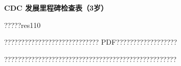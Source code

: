 \documentclass[11pt]{article}
\begin{document}
{\color[HTML]{0A84FF}\LARGE\bfseries CDC 发展里程碑检查表（3岁）\par}
{\color[HTML]{667085}\small ?????res110\par}
\vspace{1em}
???????????????????????????? PDF??????????????????

???????????????????????????????????????????????????
\end{document}
